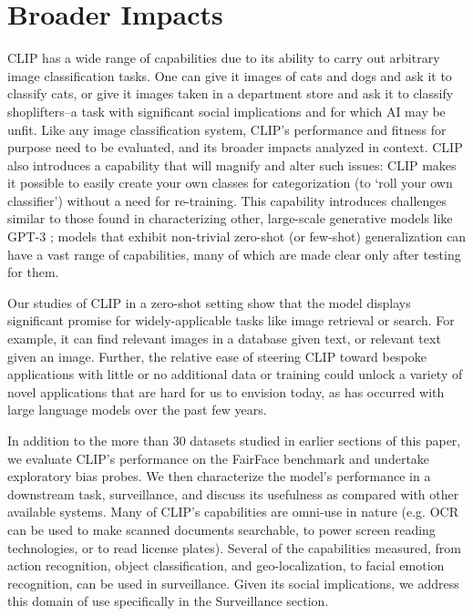 \section{Broader Impacts}\label{sec:broader-impacts}
CLIP has a wide range of capabilities due to its ability to carry out arbitrary image classification tasks. One can give it images of cats and dogs and ask it to classify cats, or give it images taken in a department store and ask it to classify shoplifters--a task with significant social implications and for which AI may be unfit. Like any image classification system, CLIP's performance and fitness for purpose need to be evaluated, and its broader impacts analyzed in context. CLIP also introduces a capability that will magnify and alter such issues: CLIP makes it possible to easily create your own classes for categorization (to `roll your own classifier') without a need for re-training. This capability introduces challenges similar to those found in characterizing other, large-scale generative models like GPT-3 \citep{brown2020language}; models that exhibit non-trivial zero-shot (or few-shot) generalization can have a vast range of capabilities, many of which are made clear only after testing for them. 

Our studies of CLIP in a zero-shot setting show that the model displays significant promise for widely-applicable tasks like image retrieval or search. For example, it can find relevant images in a database given text, or relevant text given an image. Further, the relative ease of steering CLIP toward bespoke applications with little or no additional data or training could unlock a variety of novel applications that are hard for us to envision today, as has occurred with large language models over the past few years. 

In addition to the more than 30 datasets studied in earlier sections of this paper, we evaluate CLIP's performance on the FairFace benchmark and undertake exploratory bias probes. We then characterize the model's performance in a downstream task, surveillance, and discuss its usefulness as compared with other available systems. Many of CLIP’s capabilities are omni-use in nature (e.g. OCR can be used to make scanned documents searchable, to power screen reading technologies, or to read license plates). Several of the capabilities measured, from action recognition, object classification, and geo-localization, to facial emotion recognition, can be used in surveillance. Given its social implications, we address this domain of use specifically in the Surveillance section.


